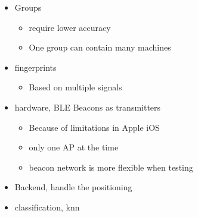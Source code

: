 
\begin{itemize}

\item Groups
    \begin{itemize}
    \item require lower accuracy
    \item One group can contain many machines
    \end{itemize}
\item fingerprints
\begin{itemize}
    \item Based on multiple signals
\end{itemize}
\item hardware, BLE Beacons as transmitters
    \begin{itemize}
    \item Because of limitations in Apple iOS
    \item only one AP at the time
    \item beacon network is more flexible when testing
    \end{itemize}

\item Backend, handle the positioning
\item classification, knn
\end{itemize}

